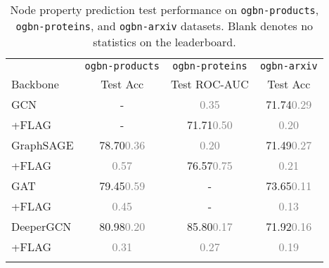 \documentclass[11pt]{article}
\newcommand{\bftab}{\fontseries{b}\selectfont}
\begin{document}
\begin{table}[t] 
	\caption{Node property prediction test performance on \texttt{ogbn-products}, \texttt{ogbn-proteins},  and \texttt{ogbn-arxiv} datasets. Blank denotes no statistics on the leaderboard.}
\centering
\begin{tabular}{lccc}
\Xhline{2\arrayrulewidth}
 	& \texttt{ogbn-products} & \texttt{ogbn-proteins} & \texttt{ogbn-arxiv}   \\
 Backbone	& Test Acc      & Test ROC-AUC & Test Acc \\
\hline\hline
GCN & - & \bftab72.51\textcolor{gray}{  {0.35}}   			&  71.74\textcolor{gray}{  {0.29}}               \\
+FLAG & -  & 71.71\textcolor{gray}{  {0.50}}              			&  \bftab72.04\textcolor{gray}{  {0.20}}     \\
\hline
GraphSAGE     & 78.70\textcolor{gray}{  {0.36}} & \bftab77.68 \textcolor{gray}{  {0.20}}  & 71.49\textcolor{gray}{  {0.27}}     \\
+FLAG   & \bftab79.36\textcolor{gray}{  {0.57}}  & 76.57\textcolor{gray}{  {0.75}}  &\bftab72.19\textcolor{gray}{  {0.21}}           \\
\hline
GAT                     & 79.45\textcolor{gray}{  {0.59}}  &   -     &      73.65\textcolor{gray}{  {0.11}}         \\
+FLAG                   & \bftab81.76\textcolor{gray}{  {0.45}}  &  -   & \bftab73.71\textcolor{gray}{  {0.13}}           \\
\hline
DeeperGCN               & 80.98\textcolor{gray}{  {0.20}}     & 85.80\textcolor{gray}{  {0.17}}    & 71.92\textcolor{gray}{  {0.16}}   \\
+FLAG                   & \bftab81.93\textcolor{gray}{  {0.31}}  &     \bftab85.96\textcolor{gray}{  {0.27}}    &     \bftab72.14\textcolor{gray}{  {0.19}}         \\
\Xhline{2\arrayrulewidth}
	\end{tabular}

	\label{tab:node-main}
\end{table}
\end{document}

